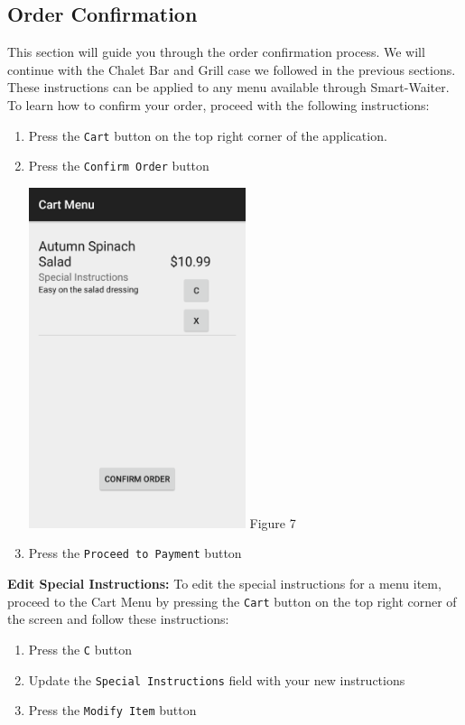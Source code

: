 \documentclass[12pt, titlepage]{article}
\begin{document}
\subsection{Order Confirmation}
This section will guide you through the order confirmation process. We will continue with the Chalet Bar and Grill case we followed in the previous sections. These instructions can be applied to any menu available through Smart-Waiter. To learn how to confirm your order, proceed with the following instructions:

	\begin{enumerate}
		\item Press the \texttt{Cart} button on the top right corner of the 			application.
		\item Press the \texttt{Confirm Order} button
		\begin{center}
			\includegraphics[width=0.5\textwidth]{confirm-order.png}
			\linebreak Figure 7
		\end{center}
		\item Press the \texttt{Proceed to Payment} button
	\end{enumerate}
	
	\textbf{Edit Special Instructions:}
	To edit the special instructions for a menu item, proceed to the Cart Menu by pressing the \texttt{Cart} button on the top right corner of the screen and follow these instructions:
	
	\begin{enumerate}
		\item Press the \texttt{C} button
		\item Update the \texttt{Special Instructions} field with your new instructions
		\item Press the \texttt{Modify Item} button
	\end{enumerate}
	
\end{document}
